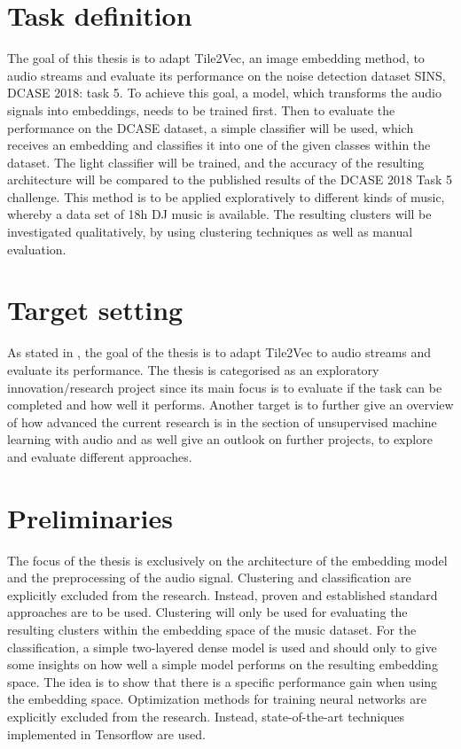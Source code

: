 \section{Task definition}
\label{sub:Task-Definition}
The goal of this thesis is to adapt Tile2Vec, an image embedding method, to audio streams and evaluate its performance on the noise detection dataset \flqq SINS, DCASE 2018: task 5\frqq. 
\newline
\newline
To achieve this goal, a model, which transforms the audio signals into embeddings, needs to be trained first. Then to evaluate the performance on the DCASE dataset, a simple classifier will be used, which receives an embedding and classifies it into one of the given classes within the dataset. The light classifier will be trained, and the accuracy of the resulting architecture will be compared to the published results of the DCASE 2018 Task 5 challenge.
\newline
\newline
This method is to be applied exploratively to different kinds of music, whereby a data set of 18h DJ music is available. The resulting clusters will be investigated qualitatively, by using clustering techniques as well as manual evaluation.

\section{Target setting}
\label{sub:Target-Setting}
As stated in , the goal of the thesis is to adapt Tile2Vec to audio streams and evaluate its performance. The thesis is categorised as an exploratory innovation/research project since its main focus is to evaluate if the task can be completed and how well it performs. Another target is to further give an overview of how advanced the current research is in the section of unsupervised machine learning with audio and as well give an outlook on further projects, to explore and evaluate different approaches.

\section{Preliminaries}
\label{sub:Preliminaries}
The focus of the thesis is exclusively on the architecture of the embedding model and the preprocessing of the audio signal. Clustering and classification are explicitly excluded from the research. Instead, proven and established standard approaches are to be used.
\newline
\newline
Clustering will only be used for evaluating the resulting clusters within the embedding space of the music dataset. For the classification, a simple two-layered dense model is used and should only to give some insights on how well a simple model performs on the resulting embedding space. The idea is to show that there is a specific performance gain when using the embedding space.
\newline
\newline
Optimization methods for training neural networks are explicitly excluded from the research. Instead, state-of-the-art techniques implemented in Tensorflow are used.
